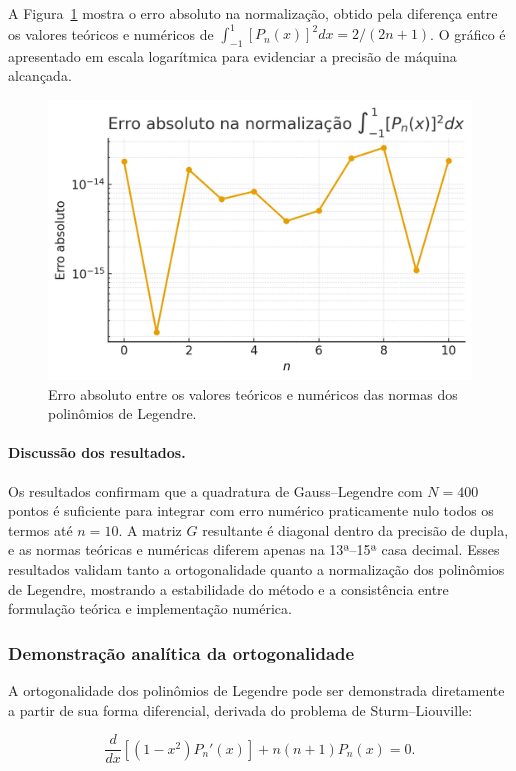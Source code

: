 \documentclass[12pt,a4paper]{article}
\begin{document}
A Figura~\ref{fig:legendre_error_plot} mostra o erro absoluto na normalização,
obtido pela diferença entre os valores teóricos e numéricos de
\(\int_{-1}^{1}[P_n(x)]^2dx = 2/(2n+1)\).
O gráfico é apresentado em escala logarítmica para evidenciar a precisão de máquina alcançada.

\begin{figure}[H]
  \centering
  \includegraphics[width=0.7\linewidth]{figures/legendre_norm_error.png}
  \caption{Erro absoluto entre os valores teóricos e numéricos das normas dos polinômios de Legendre.}
  \label{fig:legendre_error_plot}
\end{figure}

\paragraph{Discussão dos resultados.}
Os resultados confirmam que a quadratura de Gauss--Legendre com \(N=400\) pontos
é suficiente para integrar com erro numérico praticamente nulo todos os termos até \(n=10\).
A matriz \(G\) resultante é diagonal dentro da precisão de dupla, e as normas teóricas e numéricas
diferem apenas na 13ª–15ª casa decimal.  
Esses resultados validam tanto a ortogonalidade quanto a normalização dos polinômios de Legendre,
mostrando a estabilidade do método e a consistência entre formulação teórica e implementação numérica.

\subsubsection{Demonstração analítica da ortogonalidade}

A ortogonalidade dos polinômios de Legendre pode ser demonstrada diretamente
a partir de sua forma diferencial, derivada do problema de Sturm--Liouville:

\[
\frac{d}{dx}\!\left[(1-x^2)P_n'(x)\right] + n(n+1)P_n(x) = 0.
\]
\end{document}
